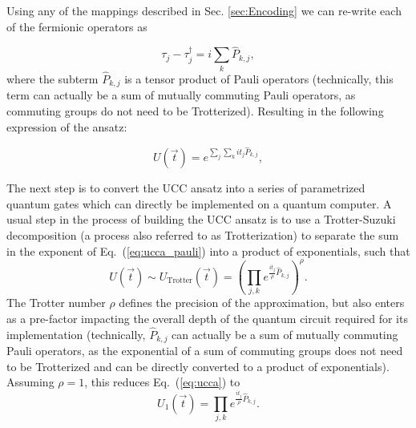 Using any of the mappings described in Sec. \ref{sec:Encoding} we can re-write each of the fermionic operators as

\begin{equation} \label{eq:ucc_operators}
\tau_j - \tau^\dagger _j = i \sum_k \hat{P}_{k, j},
\end{equation}
where the subterm $\hat{P}_{k, j}$ is a tensor product of Pauli operators (technically, this term can actually be a sum of mutually commuting Pauli operators, as commuting groups do not need to be Trotterized). Resulting in the following expression of the ansatz:

\begin{equation} \label{eq:ucca_pauli}
U(\vec{t}) = e^{\sum_j \sum_k i t_j  \hat{P}_{k, j}},
\end{equation}

The next step is to convert the UCC ansatz into a series of parametrized quantum gates which can directly be implemented on a quantum computer. A usual step in the process of building the UCC ansatz is to use a Trotter-Suzuki decomposition (a process also referred to as Trotterization) to separate the sum in the exponent of Eq.~(\ref{eq:ucca_pauli}) into a product of exponentials, such that
\begin{equation}
U(\vec{t}) \sim  U_{\text{Trotter}}(\vec{t}) = \left( \prod_{j, k} e^{\frac{i t_j}{\rho}\hat{P}_{k, j}} \right)^\rho.
\end{equation}
The Trotter number $\rho$ defines the precision of the approximation, but also enters as a pre-factor impacting the overall depth of the quantum circuit required for its implementation (technically, $\hat{P}_{k, j}$ can actually be a sum of mutually commuting Pauli operators, as the exponential of a sum of commuting groups does not need to be Trotterized and can be directly converted to a product of exponentials). Assuming $\rho=1$, this reduces Eq.~(\ref{eq:ucca}) to
\begin{equation} \label{eq:pauli_exponential}
U_1(\vec{t}) = \prod_{j, k} e^{\frac{i t_j}{\rho}\hat{P}_{k, j}} .
\end{equation}


